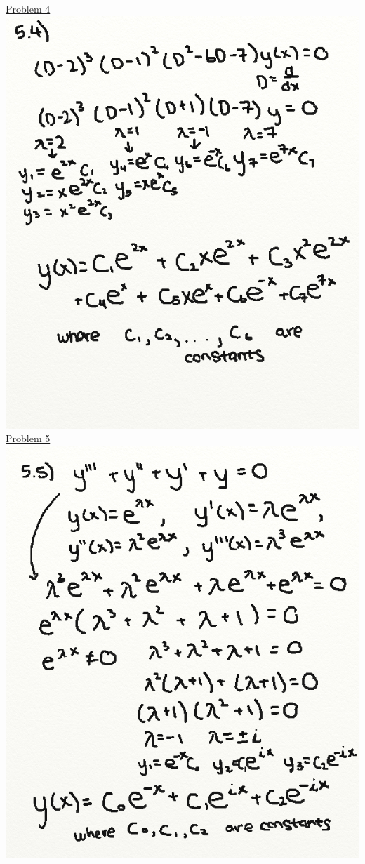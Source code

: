 \documentclass{article}
\begin{document}
\underline{Problem 4}\newline{}
\includegraphics[width=\textwidth,height=\textheight,keepaspectratio]{ams364.png}\clearpage{}
\underline{Problem 5}\newline{}
\includegraphics[width=\textwidth,height=\textheight,keepaspectratio]{ams365.png}\clearpage{}
\end{document}
